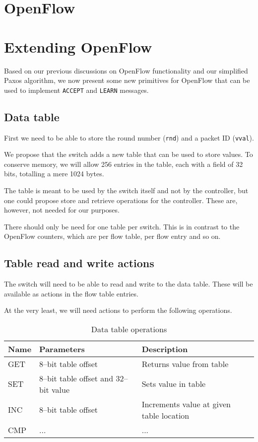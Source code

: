 \chapter{OpenFlow}


\chapter{Extending OpenFlow}

Based on our previous discussions on OpenFlow functionality and our
simplified Paxos algorithm, we now present some new primitives for OpenFlow
that can be used to implement \texttt{ACCEPT} and \texttt{LEARN} messages.

\section{Data table}

First we need to be able to store the round number (\texttt{rnd}) and a
packet ID (\texttt{vval}).

We propose that the switch adds a new table that can be used to store
values.  To conserve memory, we will allow 256 entries in the table, each
with a field of 32 bits, totalling a mere 1024 bytes.

The table is meant to be used by the switch itself and not by the
controller, but one could propose store and retrieve operations for the
controller.  These are, however, not needed for our purposes.

There should only be need for one table per switch.  This is in contrast to
the OpenFlow counters, which are per flow table, per flow entry and so on.

\section{Table read and write actions}

The switch will need to be able to read and write to the data table.
These will be available as actions in the flow table entries.

At the very least, we will need actions to perform the following operations.


\begin{table}[H]
  \begin{tabular}{|l|l|l|}
    \hline \textbf{Name} & \textbf{Parameters} & \textbf{Description} \\
    \hline GET & 8--bit table offset & Returns value from table \\
    \hline SET & 8--bit table offset and 32--bit value & Sets value in table \\
    \hline INC & 8--bit table offset & Increments value at given table location \\
    \hline CMP & ... & ... \\
    \hline
  \end{tabular}
  \caption{Data table operations}
  \label{extended.openflow.operations}
\end{table}

